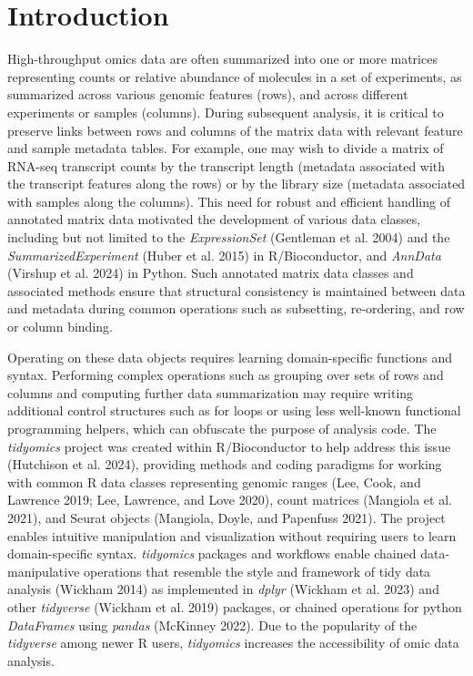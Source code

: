 \documentclass[
  letterpaper,
  DIV=11,
  numbers=noendperiod]{scrartcl}
\author{}
\date{}
\begin{document}
\section{Introduction}\label{introduction}

High-throughput omics data are often summarized into one or more
matrices representing counts or relative abundance of molecules in a set
of experiments, as summarized across various genomic features (rows),
and across different experiments or samples (columns). During subsequent
analysis, it is critical to preserve links between rows and columns of
the matrix data with relevant feature and sample metadata tables. For
example, one may wish to divide a matrix of RNA-seq transcript counts by
the transcript length (metadata associated with the transcript features
along the rows) or by the library size (metadata associated with samples
along the columns). This need for robust and efficient handling of
annotated matrix data motivated the development of various data classes,
including but not limited to the \emph{ExpressionSet} (Gentleman et al.
2004) and the \emph{SummarizedExperiment} (Huber et al. 2015) in
R/Bioconductor, and \emph{AnnData} (Virshup et al. 2024) in Python. Such
annotated matrix data classes and associated methods ensure that
structural consistency is maintained between data and metadata during
common operations such as subsetting, re-ordering, and row or column
binding.

Operating on these data objects requires learning domain-specific
functions and syntax. Performing complex operations such as grouping
over sets of rows and columns and computing further data summarization
may require writing additional control structures such as for loops or
using less well-known functional programming helpers, which can
obfuscate the purpose of analysis code. The \emph{tidyomics} project was
created within R/Bioconductor to help address this issue (Hutchison et
al. 2024), providing methods and coding paradigms for working with
common R data classes representing genomic ranges (Lee, Cook, and
Lawrence 2019; Lee, Lawrence, and Love 2020), count matrices (Mangiola
et al. 2021), and Seurat objects (Mangiola, Doyle, and Papenfuss 2021).
The project enables intuitive manipulation and visualization without
requiring users to learn domain-specific syntax. \emph{tidyomics}
packages and workflows enable chained data-manipulative operations that
resemble the style and framework of tidy data analysis (Wickham 2014) as
implemented in \emph{dplyr} (Wickham et al. 2023) and other
\emph{tidyverse} (Wickham et al. 2019) packages, or chained operations
for python \emph{DataFrames} using \emph{pandas} (McKinney 2022). Due to
the popularity of the \emph{tidyverse} among newer R users,
\emph{tidyomics} increases the accessibility of omic data analysis.
\end{document}
